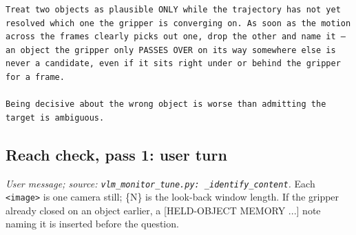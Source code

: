 \begin{lstlisting}[style=prompt]
Treat two objects as plausible ONLY while the trajectory has not yet resolved which one the gripper is converging on. As soon as the motion across the frames clearly picks out one, drop the other and name it — an object the gripper only PASSES OVER on its way somewhere else is never a candidate, even if it sits right under or behind the gripper for a frame.

Being decisive about the wrong object is worse than admitting the target is ambiguous.
\end{lstlisting}
\subsection*{Reach check, pass 1: user turn}
\noindent\textit{User message; source: \texttt{vlm\_monitor\_tune.py: \_identify\_content}.} Each \texttt{<image>} is one camera still; \{N\} is the look-back window length. If the gripper already closed on an object earlier, a [HELD-OBJECT MEMORY ...] note naming it is inserted before the question.
